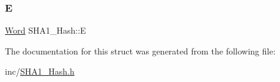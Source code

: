 \subsubsection{\texorpdfstring{E}{E}}
{\footnotesize\ttfamily \mbox{\hyperlink{class_word}{Word}} S\+H\+A1\+\_\+\+Hash\+::E}



The documentation for this struct was generated from the following file\+:\begin{DoxyCompactItemize}
\item 
inc/\mbox{\hyperlink{_s_h_a1___hash_8h}{S\+H\+A1\+\_\+\+Hash.\+h}}\end{DoxyCompactItemize}
